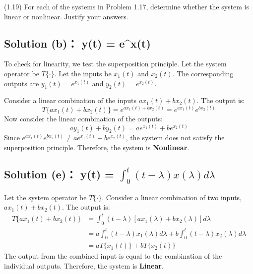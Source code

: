 \documentclass[12pt, a4paper, twoside]{ctexart}
\begin{document}
\begin{titlepage}
    \maketitlepage
\end{titlepage}
\clearpage


\begin{problem}
    \heiti{} (1.19) For each of the systems in Problem 1.17, determine whether the system is linear or nonlinear. Justify your answers.
\end{problem}

\vspace*{5pt}
\subsection*{\heiti{}Solution (b)： y(t) = e^{x(t)}}
To check for linearity, we test the superposition principle. Let the system operator be $T\{\cdot\}$.
Let the inputs be $x_1(t)$ and $x_2(t)$. The corresponding outputs are $y_1(t) = e^{x_1(t)}$ and $y_2(t) = e^{x_2(t)}$.

Consider a linear combination of the inputs $a x_1(t) + b x_2(t)$. The output is:
\begin{equation*}
    T\{a x_1(t) + b x_2(t)\} = e^{a x_1(t) + b x_2(t)} = e^{a x_1(t)} e^{b x_2(t)}
\end{equation*}
Now consider the linear combination of the outputs:
\begin{equation*}
    a y_1(t) + b y_2(t) = a e^{x_1(t)} + b e^{x_2(t)}
\end{equation*}
Since $e^{a x_1(t)} e^{b x_2(t)} \neq a e^{x_1(t)} + b e^{x_2(t)}$, the system does not satisfy the superposition principle.
Therefore, the system is \textbf{Nonlinear}.

\vspace*{20pt}
\subsection*{\heiti{}Solution (e)： y(t) = $\int_0^t (t-\lambda)x(\lambda)d\lambda$}
Let the system operator be $T\{\cdot\}$. Consider a linear combination of two inputs, $a x_1(t) + b x_2(t)$. The output is:
\begin{align*}
    T\{a x_1(t) + b x_2(t)\} &= \int_0^t (t-\lambda)[a x_1(\lambda) + b x_2(\lambda)]d\lambda \\
    &= a \int_0^t (t-\lambda)x_1(\lambda)d\lambda + b \int_0^t (t-\lambda)x_2(\lambda)d\lambda \\
    &= a T\{x_1(t)\} + b T\{x_2(t)\}
\end{align*}
The output from the combined input is equal to the combination of the individual outputs.
Therefore, the system is \textbf{Linear}.
\end{document}
